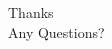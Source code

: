 \documentclass{beamer}
\def\rnum{\mathbb{R}}
\begin{document}
\begin{frame}
    \nocite{*}
    \printbibliography
\end{frame}

\begin{frame}
    \centering
    Thanks \\
    Any Questions?
\end{frame}





\end{document}
